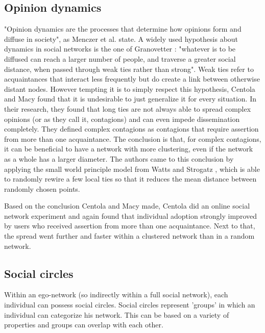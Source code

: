 \subsection{Opinion dynamics}\label{opindyn}
"Opinion dynamics are the processes that determine how opinions form and diffuse in society", as Menczer et al. \cite{menczer_fortunato_davis_2020} state. A widely used hypothesis about dynamics in social networks is the one of Granovetter \cite{Granovetter1973}: "whatever is to be diffused can reach a larger number of people, and traverse a greater social distance, when passed through weak ties rather than strong". Weak ties refer to acquaintances that interact less frequently but do create a link between otherwise distant nodes. However tempting it is to simply respect this hypothesis, Centola and Macy \cite{centola2007complex} found that it is undesirable to just generalize it for every situation. In their research, they found that long ties are not always able to spread complex opinions (or as they call it, contagions) and can even impede dissemination completely. They defined complex contagions as contagions that require assertion from more than one acquaintance. The conclusion is that, for complex contagions, it can be beneficial to have a network with more clustering, even if the network as a whole has a larger diameter. The authors came to this conclusion by applying the small world principle model from Watts and Strogatz \cite{watts1998collective}, which is able to randomly rewire a few local ties so that it reduces the mean distance between randomly chosen points.

Based on the conclusion Centola and Macy \cite{centola2007complex} made, Centola \cite{centola2010spread} did an online social network experiment and again found that individual adoption strongly improved by users who received assertion from more than one acquaintance. Next to that, the spread went further and faster within a clustered network than in a random network.



\subsection{Social circles}
Within an ego-network (so indirectly within a full social network), each individual can possess social circles. Social circles represent 'groups' in which an individual can categorize his network. This can be based on a variety of properties and groups can overlap with each other. 

